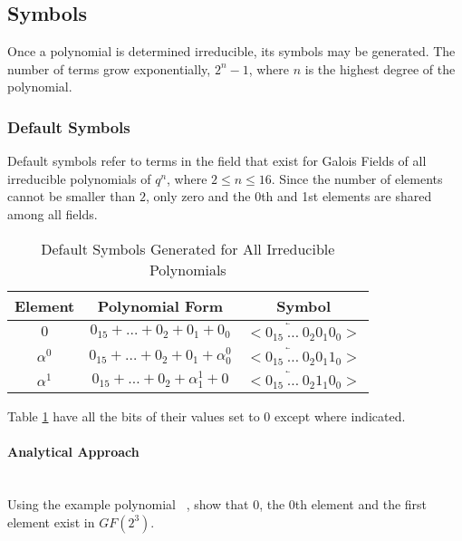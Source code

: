 \subsection{Symbols}

    Once a polynomial is determined irreducible, its symbols may be generated.
    The number of terms grow exponentially, $2^{n}-1$, where $n$ is the highest
    degree of the polynomial.

    \subsubsection{Default Symbols}

    Default symbols refer to terms in the field that exist for Galois Fields of
    all irreducible polynomials of $q^n$, where $2 \leq n
    \leq 16$. Since the number of elements cannot be smaller than $2$, only
    zero and the 0th and 1st elements are shared among all fields.

    \begin{table}[h]
        \def\arraystretch{2.5}
        \caption{Default Symbols Generated for All Irreducible Polynomials}
        \centering
        \begin{tabular*}{300pt}{@{\extracolsep{\fill}} ccc}

        \textbf{Element} & \textbf{Polynomial Form} & \textbf{Symbol}
        \\
        \hline $0$ & $0_{15} + \ldots + 0_{2} + 0_{1} + 0_{0}$ & $<
        \overleftarrow{0_{15} \ \ldots \ 0_{2}} 0_{1} 0_{0} >$ \\

        $\alpha^{0}$ & $0_{15} + \ldots + 0_{2} + 0_{1} + \alpha^{0}_{0}$ &
        $<\overleftarrow{0_{15} \ \ldots \ 0_{2}} 0_{1} 1_{0} >$ \\

        $\alpha^{1}$ & $0_{15} + \ldots + 0_{2} + \alpha^{1}_{1} + 0$ &
        $<\overleftarrow{0_{15} \ \ldots \ 0_{2}} 1_{1} 0_{0} >$ \\

        \end{tabular*}
        \label{table:default_sym}
    \end{table}

    Table \ref{table:default_sym} have all the bits of their values set to $0$
    except where indicated.

        \paragraph{Analytical Approach} \leavevmode\\ Using the example
        polynomial \examplepoly~, show that 0, the 0th element and the first
        element exist in $GF(2^{3})$.

